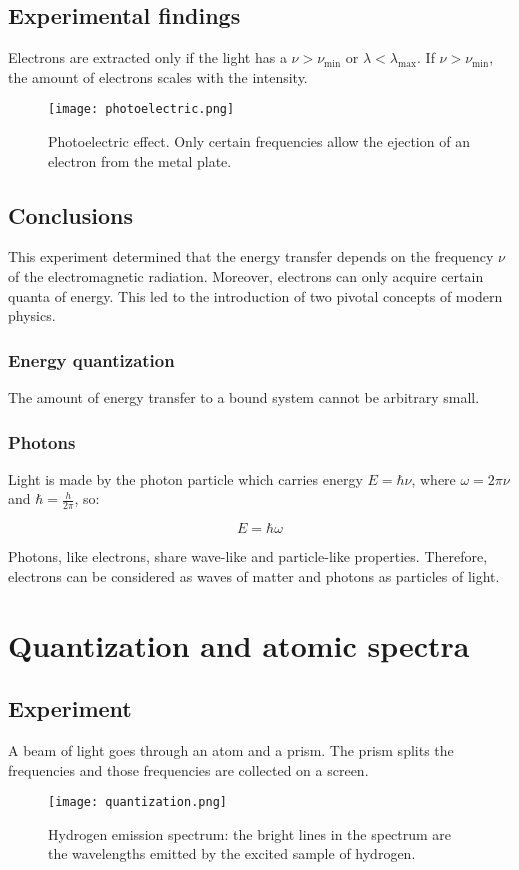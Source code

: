   \subsection{Experimental findings}
  Electrons are extracted only if the light has a $\nu > \nu_{\min}$ or $\lambda<\lambda_{\max}$.
  If $\nu>\nu_{\min}$, the amount of electrons scales with the intensity.
\begin{figure}[h!]
    \centering
    \texttt{[image: photoelectric.png]}
    \caption{\label{fig:photoelectric} Photoelectric effect. Only certain frequencies allow the ejection of an electron from the metal plate.}
\end{figure}
  \subsection{Conclusions}
  This experiment determined that the energy transfer depends on the frequency $\nu$ of the electromagnetic radiation.
  Moreover, electrons can only acquire certain quanta of energy.
  This led to the introduction of two pivotal concepts of modern physics.

    \subsubsection{Energy quantization}
    The amount of energy transfer to a bound system cannot be arbitrary small.

    \subsubsection{Photons}
    Light is made by the photon particle which carries energy $E = \hbar\nu$, where $\omega = 2\pi\nu$ and $\hbar = \frac{h}{2\pi}$, so:

    $$E = \hbar\omega$$

    Photons, like electrons, share wave-like and particle-like properties.
    Therefore, electrons can be considered as waves of matter and photons as particles of light.

\section{Quantization and atomic spectra}

  \subsection{Experiment}
  A beam of light goes through an atom and a prism.
  The prism splits the frequencies and those frequencies are collected on a screen.
\begin{figure}[h!]
    \centering
    \texttt{[image: quantization.png]}
    \caption{\label{fig:quantization} Hydrogen emission spectrum: the bright lines in the spectrum are the wavelengths emitted by the excited sample of hydrogen.}
\end{figure}
